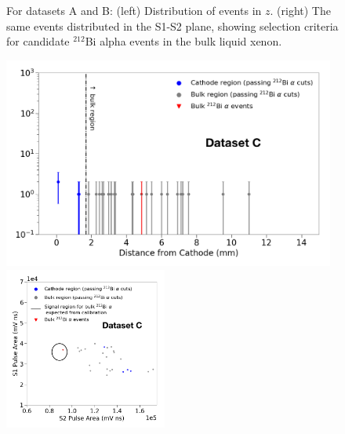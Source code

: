 \begin{figure}[hbtp]
\caption{For datasets A and B: (left) Distribution of events in $z$. (right)  The same events distributed in the S1-S2 plane, showing selection criteria for candidate $^{212}$Bi alpha events in the bulk liquid xenon.} 
\label{fig:all_plots_AB}
\end{figure}

\begin{figure}[hbtp]
\centering
\includegraphics[width=4.3in]{figures/radon/hist_bkg_label.png} \includegraphics[width=2.1in]{figures/radon/signalregion_bkg_label.png}\\

\end{figure}

